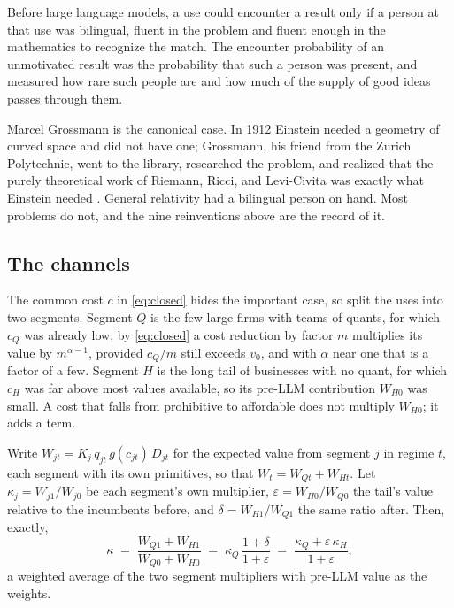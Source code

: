 \documentclass[11pt]{article}
\theoremstyle{definition}
\theoremstyle{remark}
\begin{document}
Before large language models, a use could encounter a result only if a person at that use was bilingual, fluent in the problem and fluent enough in the mathematics to recognize the match. The encounter probability of an unmotivated result was the probability that such a person was present, and \citet{burt2004} measured how rare such people are and how much of the supply of good ideas passes through them.

Marcel Grossmann is the canonical case. In 1912 Einstein needed a geometry of curved space and did not have one; Grossmann, his friend from the Zurich Polytechnic, went to the library, researched the problem, and realized that the purely theoretical work of Riemann, Ricci, and Levi-Civita was exactly what Einstein needed \citep{pais1982}. General relativity had a bilingual person on hand. Most problems do not, and the nine reinventions above are the record of it.

\subsection*{The channels}

The common cost $c$ in \eqref{eq:closed} hides the important case, so split the uses into two segments. Segment $Q$ is the few large firms with teams of quants, for which $c_Q$ was already low; by \eqref{eq:closed} a cost reduction by factor $m$ multiplies its value by $m^{\alpha-1}$, provided $c_Q/m$ still exceeds $v_0$, and with $\alpha$ near one that is a factor of a few. Segment $H$ is the long tail of businesses with no quant, for which $c_H$ was far above most values available, so its pre-LLM contribution $W_{H0}$ was small. A cost that falls from prohibitive to affordable does not multiply $W_{H0}$; it adds a term.

Write $W_{jt} = K_j\, q_{jt}\, g(c_{jt})\, D_{jt}$ for the expected value from segment $j$ in regime $t$, each segment with its own primitives, so that $W_t = W_{Qt} + W_{Ht}$. Let $\kappa_j = W_{j1}/W_{j0}$ be each segment's own multiplier, $\varepsilon = W_{H0}/W_{Q0}$ the tail's value relative to the incumbents before, and $\delta = W_{H1}/W_{Q1}$ the same ratio after. Then, exactly,
\begin{equation}
\kappa \;=\; \frac{W_{Q1} + W_{H1}}{W_{Q0} + W_{H0}} \;=\; \kappa_Q\,\frac{1 + \delta}{1 + \varepsilon} \;=\; \frac{\kappa_Q + \varepsilon\,\kappa_H}{1 + \varepsilon},
\label{eq:segments}
\end{equation}
a weighted average of the two segment multipliers with pre-LLM value as the weights.
\end{document}
